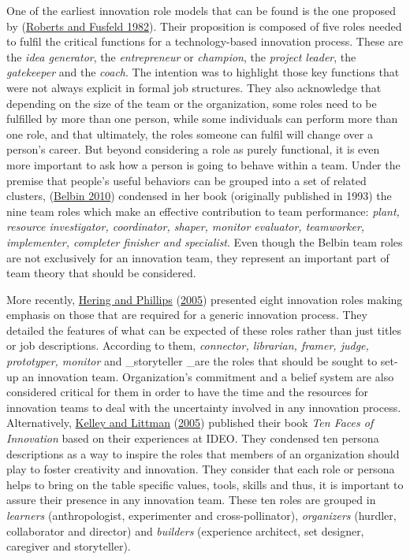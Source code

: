 \documentclass[AMA,STIX1COL,APA,STIX2COL]{WileyNJD-v2}
\begin{document}
One of the earliest innovation role models that can be found is the one
proposed by (\protect\hyperlink{ref-Roberts1982}{Roberts and Fusfeld
1982}). Their proposition is composed of five roles needed to fulfil the
critical functions for a technology-based innovation process. These are
the \emph{idea generator}, the \emph{entrepreneur} or \emph{champion},
the \emph{project leader}, the \emph{gatekeeper} and the \emph{coach}.
The intention was to highlight those key functions that were not always
explicit in formal job structures. They also acknowledge that depending
on the size of the team or the organization, some roles need to be
fulfilled by more than one person, while some individuals can perform
more than one role, and that ultimately, the roles someone can fulfil
will change over a person's career. But beyond considering a role as
purely functional, it is even more important to ask how a person is
going to behave within a team. Under the premise that people's useful
behaviors can be grouped into a set of related clusters,
(\protect\hyperlink{ref-Belbin2010}{Belbin 2010}) condensed in her book
(originally published in 1993) the nine team roles which make an
effective contribution to team performance: \emph{plant, resource
investigator, coordinator, shaper, monitor evaluator, teamworker,
implementer, completer finisher and specialist}. Even though the Belbin
team roles are not exclusively for an innovation team, they represent an
important part of team theory that should be considered.

More recently, \protect\hyperlink{ref-Hering2005}{Hering and Phillips}
(\protect\hyperlink{ref-Hering2005}{2005}) presented eight innovation
roles making emphasis on those that are required for a generic
innovation process. They detailed the features of what can be expected
of these roles rather than just titles or job descriptions. According to
them, \emph{connector, librarian, framer, judge, prototyper, monitor}
and \_storyteller \_are the roles that should be sought to set-up an
innovation team. Organization's commitment and a belief system are also
considered critical for them in order to have the time and the resources
for innovation teams to deal with the uncertainty involved in any
innovation process. Alternatively,
\protect\hyperlink{ref-Kelley2005}{Kelley and Littman}
(\protect\hyperlink{ref-Kelley2005}{2005}) published their book
\emph{Ten Faces of Innovation} based on their experiences at IDEO. They
condensed ten persona descriptions as a way to inspire the roles that
members of an organization should play to foster creativity and
innovation. They consider that each role or persona helps to bring on
the table specific values, tools, skills and thus, it is important to
assure their presence in any innovation team. These ten roles are
grouped in \emph{learners} (anthropologist, experimenter and
cross-pollinator), \emph{organizers} (hurdler, collaborator and
director) and \emph{builders} (experience architect, set designer,
caregiver and storyteller).
\end{document}
